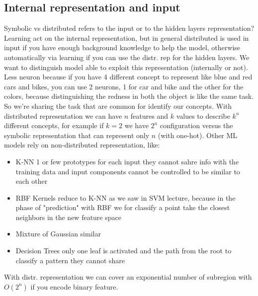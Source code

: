 \documentclass[12pt]{book}
\begin{document}
\subsection{Internal representation and input}
Symbolic vs distributed refers to the input or to the hidden layers representation? \newline
Learning act on the internal representation, but in general distributed is used in input if you have enough background knowledge to help the model, otherwise automatically via learning if you can use the distr. rep for the hidden layers.\newline
We want to distinguish model able to exploit this representation (internally or not).\newline
Less neuron because if you have 4 different concept to represent like blue and red cars and bikes, you can use 2 neurons, 1 for car and bike and the other for the colors, because distinguishing the redness in both the object is like the same task. So we're sharing the task that are common for identify our concepts.\newline
With distributed representation we can have $n$ features and $k$ values to describe $k^n$ different concepts, for example if $k = 2$ we have $2^n$ configuration versus the symbolic representation that can represent only $n$ (with one-hot). Other ML models rely on non-distributed representation, like:
\begin{itemize}
	\item K-NN 1 or few prototypes for each input they cannot sahre info with the training data and input components cannot be controlled to be similar to each other
	\item RBF Kernels reduce to K-NN as we saw in SVM lecture, because in the phase of "prediction" with RBF we for classify a point take the closest neighbors in the new feature space
	\item Mixture of Gaussian similar
		\item Decision Trees only one leaf is activated and the path from the root to classify a pattern they cannot share
\end{itemize}
With distr. representation we can cover an exponential number of subregion with $O(2^n)$ if you encode binary feature.
\end{document}
